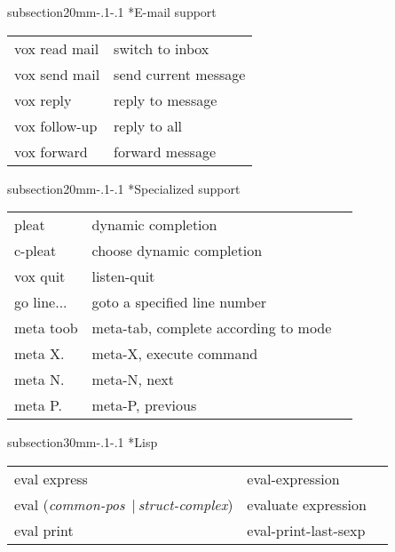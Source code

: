 \documentclass[twocolumn,10pt]{article}
\makeatletter
\renewcommand{\subsection}{\@startsection
  {subsection}{2}{0mm}{-.1\baselineskip}{-.1\baselineskip}%
  {\normalfont\bfseries}}
\renewcommand{\subsubsection}{\@startsection
  {subsection}{3}{0mm}{-.1\baselineskip}{-.1\baselineskip}%
  {\normalfont\bfseries}}
\newcommand{\vbar}{$\,|\,$}
\newcommand{\command}[1]{\textsf{\textup{#1}}}
\newcommand{\cmd}{\sffamily\upshape}
\newcommand{\cat}[1]{\textrm{\textit{#1}}}
\newenvironment{mycenter}
{\begin{trivlist}\item \begin{footnotesize}}
{\end{footnotesize}\end{trivlist}}
\makeatother
\begin{document}
  \subsection*{E-mail support}
  \begin{mycenter}
    \begin{tabular}[t]{ll}
      \command{vox} \command{read} \command{mail}& switch to inbox \\
       \cmd vox send mail& send current message \\
       \cmd vox reply& reply to message \\
       \cmd vox follow-up& reply to all \\
       \cmd vox forward& forward message \\
    \end{tabular}
  \end{mycenter}

  \subsection*{Specialized support}

  \begin{mycenter}
    \begin{tabular}[t]{lll}
      \cmd pleat & dynamic completion\\
      \cmd c-pleat & choose dynamic completion\\
      \cmd vox quit &  listen-quit \\
     \cmd go line... & goto a specified line number \\
     \cmd meta toob & meta-tab, complete according to mode\\
     \cmd meta X. & meta-X,  execute command \\
     \cmd meta N.& meta-N, next \\
     \cmd meta P.& meta-P, previous \\
    \end{tabular}
  \end{mycenter}

  \subsubsection*{Lisp}
  \begin{mycenter}
    \begin{tabular}[t]{lll}
      \cmd eval express & eval-expression \\
      \cmd eval (\cat{common-pos} \vbar \cat{struct-complex}) & evaluate
      expression \\
      \cmd eval print& eval-print-last-sexp \\
    \end{tabular}
  \end{mycenter}
\end{document}
